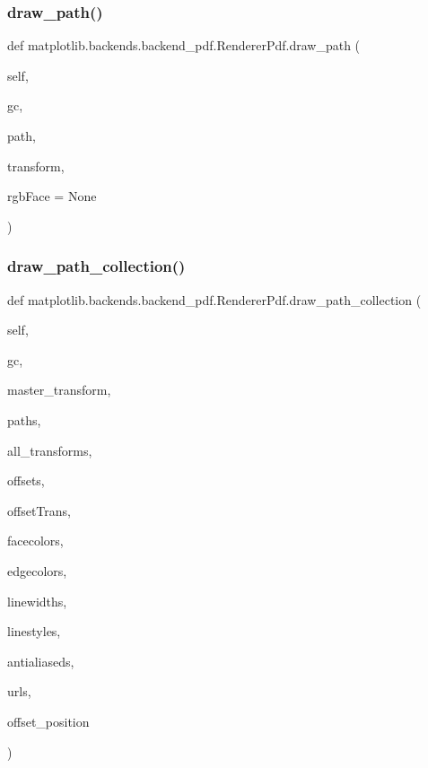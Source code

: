 \subsubsection{\texorpdfstring{draw\+\_\+path()}{draw\_path()}}
{\footnotesize\ttfamily def matplotlib.\+backends.\+backend\+\_\+pdf.\+Renderer\+Pdf.\+draw\+\_\+path (\begin{DoxyParamCaption}\item[{}]{self,  }\item[{}]{gc,  }\item[{}]{path,  }\item[{}]{transform,  }\item[{}]{rgb\+Face = {\ttfamily None} }\end{DoxyParamCaption})}

\mbox{\label{classmatplotlib_1_1backends_1_1backend__pdf_1_1RendererPdf_a1698276fa3f816088f8bea79402e4cb0}} 
\subsubsection{\texorpdfstring{draw\+\_\+path\+\_\+collection()}{draw\_path\_collection()}}
{\footnotesize\ttfamily def matplotlib.\+backends.\+backend\+\_\+pdf.\+Renderer\+Pdf.\+draw\+\_\+path\+\_\+collection (\begin{DoxyParamCaption}\item[{}]{self,  }\item[{}]{gc,  }\item[{}]{master\+\_\+transform,  }\item[{}]{paths,  }\item[{}]{all\+\_\+transforms,  }\item[{}]{offsets,  }\item[{}]{offset\+Trans,  }\item[{}]{facecolors,  }\item[{}]{edgecolors,  }\item[{}]{linewidths,  }\item[{}]{linestyles,  }\item[{}]{antialiaseds,  }\item[{}]{urls,  }\item[{}]{offset\+\_\+position }\end{DoxyParamCaption})}

